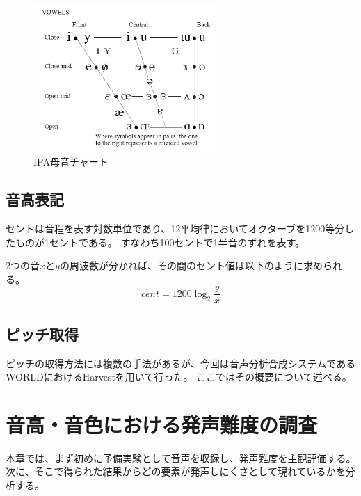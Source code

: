 \documentclass[10ptj,a4j,dvipdfmx,uplatex, oneside, openany]{jsbook}%
\begin{document}
\begin{figure}[htbp]
    \begin{center}
      \includegraphics[clip,width=7.0cm]{vowels.png}
      \caption{IPA母音チャート\cite{vowels}}
      \label{vowels}
    \end{center}
\end{figure}

\section{音高表記}
セントは音程を表す対数単位であり、12平均律においてオクターブを1200等分したものが1セントである。
すなわち100セントで1半音のずれを表す。

2つの音$x$と$y$の周波数が分かれば、その間のセント値は以下のように求められる。
\begin{equation}
    cent = 1200 \log_2 \frac{y}{x} 
\end{equation}


\section{ピッチ取得}
ピッチの取得方法には複数の手法があるが、今回は音声分析合成システムであるWORLD\cite{world}におけるHarvestを用いて行った。
ここではその概要について述べる。





\chapter{音高・音色における発声難度の調査}
本章では、まず初めに予備実験として音声を収録し、発声難度を主観評価する。
次に、そこで得られた結果からどの要素が発声しにくさとして現れているかを分析する。
\end{document}
